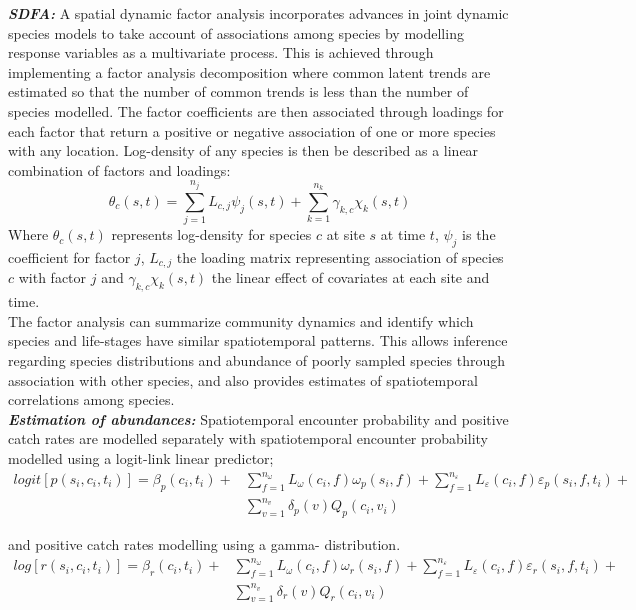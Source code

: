 \documentclass[fleqn,10pt]{wlscirep}
\begin{document}
\begin{linenumbers}
\textbf{\textit{SDFA:}} A spatial dynamic factor analysis incorporates advances
in joint dynamic species models\cite{Thorson2017} to take account of
associations among species by modelling response variables as a multivariate
process. This is achieved through implementing a factor analysis decomposition
where common latent trends are estimated so that the number of common trends is
less than the number of species modelled. The factor coefficients are then
associated through loadings for each factor that return a positive or negative
association of one or more species with any location. Log-density of any
species is then be described as a linear combination of factors and loadings:
\begin{equation} \theta_{c}(s,t) = \sum_{j=1}^{n_{j}} L_{c,j}\psi_{j}(s,t)
	+\sum_{k=1}^{n_{k}} \gamma_{k,c}\chi_{k}(s,t) \end{equation} Where
$\theta_{c}(s,t)$ represents log-density for species $c$ at site $s$ at time
$t$, $\psi_{j}$ is the coefficient for factor $j$, $L_{c,j}$ the loading matrix
representing association of species $c$ with factor $j$ and
$\gamma_{k,c}\chi_{k}(s,t)$ the linear effect of covariates at each site and
time\cite{Thorson2016b}. \\

The factor analysis can summarize community dynamics and identify which species
and life-stages have similar spatiotemporal patterns. This allows inference
regarding species distributions and abundance of poorly sampled species through
association with other species, and also provides estimates of spatiotemporal
correlations among species\cite{Thorson2016b}.\\

\textbf{\textit{Estimation of abundances:}} Spatiotemporal encounter
probability and positive catch rates are modelled separately with
spatiotemporal encounter probability modelled using a logit-link linear
predictor;
		\begin{equation}
			\begin{split}
			logit[p(s_{i},c_{i},t_{i})] =	\beta_{p}(c_{i},t_{i}) +
			& \sum\limits_{f=1}^{n_{\omega}} L_{\omega}(c_{i},f)
			\omega_{p}(s_{i},f) + \sum\limits_{f=1}^{n_{\varepsilon}}
			L_{\varepsilon}(c_{i},f) \varepsilon_{p}(s_{i},f,t_{i}) + \\ 
			& \sum\limits_{v=1}^{n_{v}}\delta_{p}(v)Q_{p}(c_{i}, v_{i})
		\end{split}
		\end{equation}

and positive catch rates modelling using a gamma- distribution\cite{Thorson2015a}. 
		\begin{equation}
			\begin{split}
			log[r(s_{i},c_{i},t_{i})] = \beta_{r}(c_{i},t_{i}) +
			& \sum\limits_{f=1}^{n_{\omega}} L_{\omega}(c_{i},f)
			\omega_{r}(s_{i},f) +\sum\limits_{f=1}^{n_{\varepsilon}} 
			L_{\varepsilon}(c_{i},f) \varepsilon_{r}(s_{i},f,t_{i}) + \\
			& \sum\limits_{v=1}^{n_{v}}\delta_{r}(v) Q_{r}(c_{i}, v_{i})
			\end{split}
		\end{equation}


\end{linenumbers}
\end{document}
